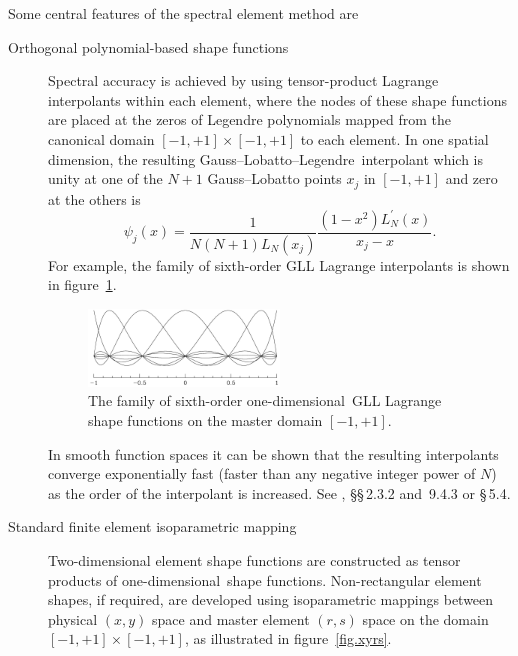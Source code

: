 \documentclass[11pt]{report}
\newcommand\oned{one-di\-men\-sion\-al}
\newcommand\GLL{Gauss--Lobatto--Legendre}
\begin{document}
Some central features of the spectral element method are
\begin{description}
\item[Orthogonal polynomial-based shape functions] Spectral accuracy
  is achieved by using tensor-product Lagrange interpolants within
  each element, where the nodes of these shape functions are placed at
  the zeros of Legendre polynomials mapped from the canonical domain
  $[-1,+1]\times[-1,+1]$ to each element.  In one spatial dimension,
  the resulting \GLL\ interpolant which is unity at one of the $N + 1$
  Gauss--Lobatto points $x_j$ in $[-1,+1]$ and zero at the others
  is
\begin{equation}
\psi_j(x) = \frac{1}{N(N+1)L_N(x_j)}\frac{(1-x^2)L_N^\prime(x)}{x_j - x}.
\end{equation}
For example, the family of sixth-order GLL Lagrange interpolants is
shown in figure~\ref{fig:shapes}.
\begin{figure}
\begin{center}
  \includegraphics[width=0.5\textwidth]{shape7x7}
\end{center}
\caption{The family of sixth-order \oned\ GLL Lagrange shape functions
  on the master domain $[-1,+1]$.}
\label{fig:shapes}
\end{figure}
In smooth function spaces it can be shown that the resulting
interpolants converge exponentially fast (faster than any negative
integer power of $N$) as the order of the interpolant is increased.
See \citet{chqz88}, \S\S\,2.3.2 and~9.4.3 or \citet{chqz06} \S\,5.4.
\item[Standard finite element isoparametric mapping] Two-dimensional
  element shape functions are constructed as tensor products of
  \oned\ shape functions.  Non-rectangular element shapes, if
  required, are developed using isoparametric mappings between
  physical $(x,y)$ space and master element $(r,s)$ space on the domain
  $[-1,+1]\times[-1,+1]$, as illustrated in figure~\ref{fig.xyrs}.
\begin{figure}
\begin{center}

\end{center}
\end{figure}
\end{description}
\end{document}
